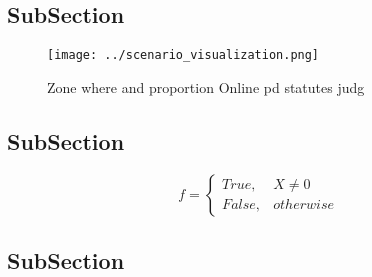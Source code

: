 \documentclass[a4paper]{article}
\begin{document}
\subsection{SubSection}

\begin{figure}
\centering
\texttt{[image: ../scenario\_visualization.png]}
\caption{Zone where and proportion Online pd statutes judg
}
\end{figure}
 
\subsection{SubSection}

\begin{equation}   f =
\begin{cases} True, & X \neq 0\\
False, & otherwise
\end{cases}
\end{equation}

\subsection{SubSection}
\end{document}
